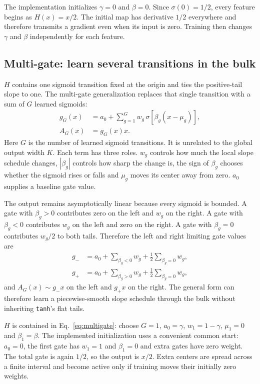 \documentclass[10pt,aps,prd,twocolumn,nofootinbib]{revtex4-2}
\newcommand{\code}[1]{\texttt{#1}}
\begin{document}
The implementation initializes \(\gamma=0\) and \(\beta=0\).  Since
\(\sigma(0)=1/2\), every feature begins as \(H(x)=x/2\).  The initial map has
derivative \(1/2\) everywhere and therefore transmits a gradient even when
its input is zero.  Training then changes \(\gamma\) and \(\beta\)
independently for each feature.

\subsection{Multi-gate: learn several transitions in the bulk}

\(H\) contains one sigmoid transition fixed at the origin and ties the
positive-tail slope to one.  The multi-gate generalization replaces that
single transition with a sum of \(G\) learned sigmoids:
\begin{align}
 g_G(x)&=a_0+\sum_{g=1}^{G}
 w_g\,\sigma\!\left[\beta_g(x-\mu_g)\right],\nonumber\\
 A_G(x)&=g_G(x)x.
 \label{eq:multigate}
\end{align}
Here $G$ is the number of learned sigmoid transitions.  It is unrelated to the
global output width $K$.  Each term has three roles.  \(w_g\) controls how much
the local slope schedule changes, $|\beta_g|$ controls how sharp the change is,
the sign of $\beta_g$ chooses whether the sigmoid rises or falls and \(\mu_g\)
moves its center away from zero.  \(a_0\) supplies a baseline gate value.

The output remains asymptotically linear because every sigmoid is bounded.
A gate with $\beta_g>0$ contributes zero on the left and $w_g$ on the right.
A gate with $\beta_g<0$ contributes $w_g$ on the left and zero on the right.
A gate with $\beta_g=0$ contributes $w_g/2$ to both tails.  Therefore the
left and right limiting gate values are
\begin{align*}
 g_-&=a_0+\sum_{\beta_g<0}w_g
             +\frac12\sum_{\beta_g=0}w_g,\\
 g_+&=a_0+\sum_{\beta_g>0}w_g
             +\frac12\sum_{\beta_g=0}w_g,
\end{align*}
and $A_G(x)\sim g_-x$ on the left and $g_+x$ on the right.
The general form can therefore learn a piecewise-smooth slope schedule through
the bulk without inheriting \code{tanh}'s flat tails.

\(H\) is contained in Eq.~\eqref{eq:multigate}: choose \(G=1\),
\(a_0=\gamma\), \(w_1=1-\gamma\), \(\mu_1=0\) and
\(\beta_1=\beta\).  The implemented initialization uses a convenient
common start: \(a_0=0\), the first gate has \(w_1=1\) and \(\beta_1=0\) and
extra gates have zero weight.  The total gate is again \(1/2\), so the output
is \(x/2\).  Extra centers are spread across a finite interval and become
active only if training moves their initially zero weights.
\end{document}
